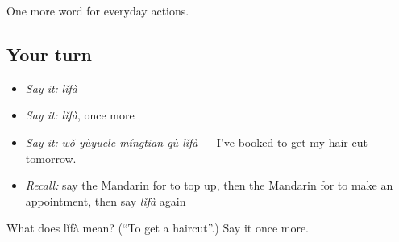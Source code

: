 \begin{grammarlens}[title={What you've built}]
One more word for everyday actions.
\end{grammarlens}

\subsection*{Your turn}
\begin{itemize}
\raggedright
  \item \emph{Say it:} \emph{lǐfà}
  \item \emph{Say it:} \emph{lǐfà}, once more
  \item \emph{Say it:} \emph{wǒ yùyuēle míngtiān qù lǐfà} — I've booked to get my hair cut tomorrow.
  \item \emph{Recall:} say the Mandarin for to top up, then the Mandarin for to make an appointment, then say \emph{lǐfà} again
\end{itemize}

\begin{tcolorbox}[breakable,colback=teal!4,colframe=teal!35!black,title={Before you move on}]
What does lǐfà mean? (\textquotedblleft{}To get a haircut\textquotedblright{}.) Say it once more.
\end{tcolorbox}
